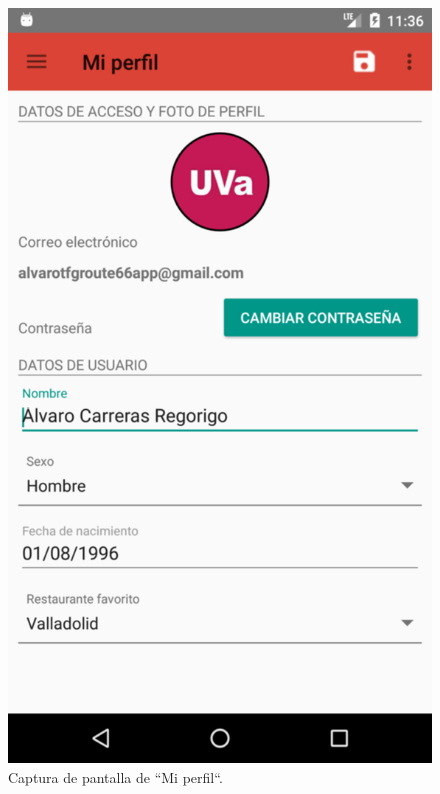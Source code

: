 \documentclass[twoside]{report}
\begin{document}
\begin{figure}[H]
\begin{center}
\includegraphics[scale=0.2]{images/userguide/4.png}
\caption{Captura de pantalla de “Mi perfil“.}
\end{center}
\end{figure}
\end{document}
